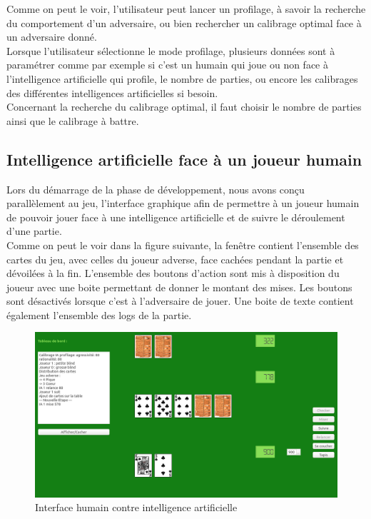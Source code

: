 \documentclass{report}
\begin{document}
Comme on peut le voir, l'utilisateur peut lancer un profilage, à savoir la recherche du comportement d'un adversaire, ou bien rechercher un calibrage optimal face à un adversaire donné.\\

Lorsque l'utilisateur sélectionne le mode profilage, plusieurs données sont à paramétrer comme par exemple si c'est un humain qui joue ou non face à l'intelligence artificielle qui profile, le nombre de parties, ou encore les calibrages des différentes intelligences artificielles si besoin.\\

Concernant la recherche du calibrage optimal, il faut choisir le nombre de parties ainsi que le calibrage à battre.\\

\subsection{Intelligence artificielle face à un joueur humain}

\hspace{0.5cm}Lors du démarrage de la phase de développement, nous avons conçu parallèlement au jeu, l'interface graphique afin de permettre à un joueur humain de pouvoir jouer face à une intelligence artificielle et de suivre le déroulement d'une partie.\\

Comme on peut le voir dans la figure suivante, la fenêtre contient l'ensemble des cartes du jeu, avec celles du joueur adverse, face cachées pendant la partie et dévoilées à la fin. L'ensemble des boutons d'action sont mis à disposition du joueur avec une boite permettant de donner le montant des mises. Les boutons sont désactivés lorsque c'est à l'adversaire de jouer. Une boite de texte contient également l'ensemble des logs de la partie.\par 

\begin{figure}[H]
\hspace{-0.5cm}
		\includegraphics[scale=0.3]{./imagesRapport/interfaceGraphiqueHumain.png}
	\caption[Interface humain contre intelligence artificielle]{Interface humain contre intelligence artificielle}
\end{figure}
\end{document}
